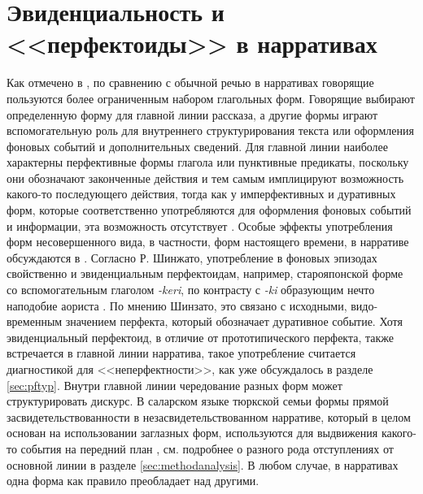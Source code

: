
\color{black}

\chapter{Эвиденциальность и <<перфектоиды>> в нарративах} \label{sec:intro3}

Как отмечено в \citep{labovwaletzky1967}, по сравнению с обычной речью в нарративах говорящие пользуются более ограниченным набором глагольных форм. Говорящие выбирают  определенную форму для главной линии рассказа, а другие формы играют вспомогательную роль для внутреннего структурирования текста или оформления фоновых событий и дополнительных сведений. Для главной линии наиболее характерны перфективные формы глагола или пунктивные предикаты, поскольку они обозначают законченные действия и тем самым имплицируют возможность какого-то последующего действия, тогда как у имперфективных и дуративных форм, которые соответственно употребляются для оформления фоновых событий и информации, эта возможность отсутствует \citep{hopper1982}. Особые эффекты употребления форм несовершенного вида, в частности, форм настоящего времени, в нарративе обсуждаются в \citep[287-290]{paducheva2010}. Согласно Р. Шинжато, употребление в фоновых эпизодах свойственно и эвиденциальным перфектоидам, например, старояпонской форме со вспомогательным глаголом \textit{-keri}, по контрасту с \textit{-ki} образующим нечто наподобие аориста \citep{shinzato1991}. По мнению Шинзато, это связано с исходными, видо-временным значением перфекта, который обозначает дуративное событие. Хотя эвиденциальный перфектоид, в отличие от прототипического перфекта, также встречается в главной линии нарратива, такое употребление считается диагностикой для <<неперфектности>>, как уже обсуждалось в разделе \ref{sec:pftyp}. Внутри главной линии чередование разных форм может структурировать дискурс. В саларском языке тюркской семьи формы прямой засвидетельствованности в незасвидетельствованном нарративе, который в целом основан на использовании заглазных форм, используются для выдвижения какого-то события на передний план \citep[55--56]{dwyer2000}, см. подробнее о разного рода отступлениях от основной линии в разделе \ref{sec:methodanalysis}. В любом случае, в нарративах одна форма как правило преобладает над другими.
